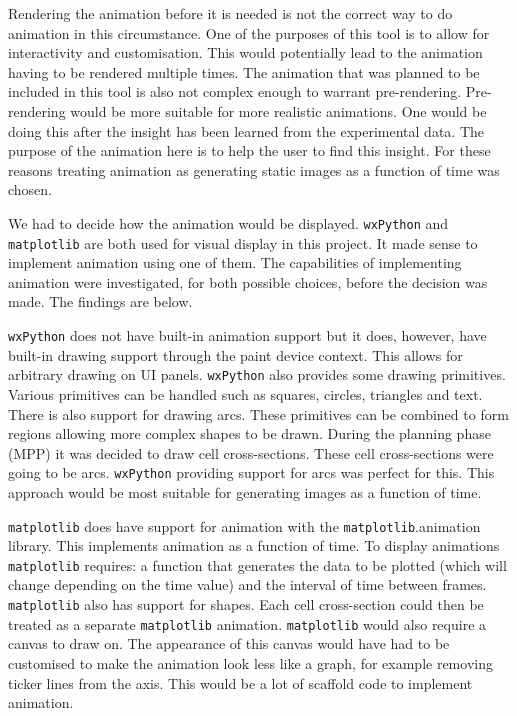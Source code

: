 Rendering the animation before it is needed is not the correct way to do animation in this circumstance.  One of the purposes of this tool is to allow for interactivity and customisation.  This would potentially lead to the animation having to be rendered multiple times.  The animation that was planned to be included in this tool is also not complex enough to warrant pre-rendering.  Pre-rendering would be more suitable for more realistic animations.  One would be doing this after the insight has been learned from the experimental data.  The purpose of the animation here is to help the user to find this insight.  For these reasons treating animation as generating static images as a function of time was chosen.

We had to decide how the animation would be displayed.  \texttt{wxPython} and \texttt{matplotlib} are both used for visual display in this project.  It made sense to implement animation using one of them.  The capabilities of implementing animation were investigated, for both possible choices, before the decision was made.  The findings are below.

\texttt{wxPython} does not have built-in animation support but it does, however, have built-in drawing support through the paint device context.  This allows for arbitrary drawing on \ac{UI} panels.  \texttt{wxPython} also provides some drawing primitives.  Various primitives can be handled such as squares, circles, triangles and text.  There is also support for drawing arcs.  These primitives can be combined to form regions allowing more complex shapes to be drawn.  During the planning phase (MPP) it was decided to draw cell cross-sections.  These cell cross-sections were going to be arcs.  \texttt{wxPython} providing support for arcs was perfect for this.  This approach would be most suitable for generating images as a function of time.

\texttt{matplotlib} does have support for animation with the \texttt{matplotlib}.animation library.  This implements animation as a function of time.  To display animations \texttt{matplotlib} requires: a function that generates the data to be plotted (which will change depending on the time value) and the interval of time between frames.  \texttt{matplotlib} also has support for shapes.  Each cell cross-section could then be treated as a separate \texttt{matplotlib} animation.  \texttt{matplotlib} would also require a canvas to draw on.  The appearance of this canvas would have had to be customised to make the animation look less like a graph, for example removing ticker lines from the axis.  This would be a lot of scaffold code to implement animation.

